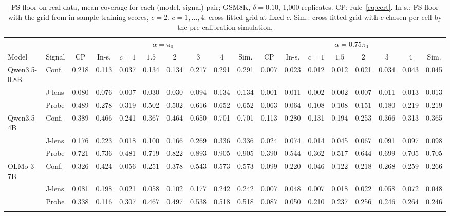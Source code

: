 \begin{table}[H]
\centering\scriptsize
\caption{FS-floor on real data, mean coverage for each (model, signal) pair; GSM8K, $\delta=0.10$, 1{,}000 replicates. CP: rule~\eqref{eq:cert}. In-s.: FS-floor with the grid from in-sample training scores, $c=2$. $c{=}1,\dots,4$: cross-fitted grid at fixed $c$. Sim.: cross-fitted grid with $c$ chosen per cell by the pre-calibration simulation.}
\label{tab:fsfull}
\setlength{\tabcolsep}{2.2pt}
\begin{tabular}{ll cccccccc cccccccc}
\toprule
 & & \multicolumn{8}{c}{$\alpha=\pi_0$} & \multicolumn{8}{c}{$\alpha=0.75\pi_0$} \\
\cmidrule(lr){3-10}\cmidrule(lr){11-18}
Model & Signal & CP & In-s. & $c{=}1$ & $1.5$ & $2$ & $3$ & $4$ & Sim. & CP & In-s. & $c{=}1$ & $1.5$ & $2$ & $3$ & $4$ & Sim. \\
\midrule
Qwen3.5-0.8B & Conf. & 0.218 & 0.113 & 0.037 & 0.134 & 0.134 & 0.217 & 0.291 & 0.291 & 0.007 & 0.023 & 0.012 & 0.012 & 0.021 & 0.034 & 0.043 & 0.045 \\
 & J-lens & 0.080 & 0.076 & 0.007 & 0.030 & 0.030 & 0.094 & 0.134 & 0.134 & 0.001 & 0.011 & 0.002 & 0.002 & 0.007 & 0.011 & 0.013 & 0.013 \\
 & Probe & 0.489 & 0.278 & 0.319 & 0.502 & 0.502 & 0.616 & 0.652 & 0.652 & 0.063 & 0.064 & 0.108 & 0.108 & 0.151 & 0.180 & 0.219 & 0.219 \\
\addlinespace
Qwen3.5-4B & Conf. & 0.389 & 0.466 & 0.241 & 0.367 & 0.464 & 0.650 & 0.701 & 0.701 & 0.113 & 0.280 & 0.131 & 0.194 & 0.253 & 0.366 & 0.313 & 0.365 \\
 & J-lens & 0.176 & 0.223 & 0.018 & 0.100 & 0.166 & 0.269 & 0.336 & 0.336 & 0.024 & 0.074 & 0.014 & 0.045 & 0.067 & 0.091 & 0.097 & 0.098 \\
 & Probe & 0.721 & 0.736 & 0.481 & 0.719 & 0.822 & 0.893 & 0.905 & 0.905 & 0.390 & 0.544 & 0.362 & 0.517 & 0.644 & 0.699 & 0.705 & 0.705 \\
\addlinespace
OLMo-3-7B & Conf. & 0.326 & 0.424 & 0.056 & 0.251 & 0.378 & 0.543 & 0.573 & 0.573 & 0.099 & 0.220 & 0.046 & 0.122 & 0.218 & 0.268 & 0.259 & 0.266 \\
 & J-lens & 0.081 & 0.198 & 0.021 & 0.058 & 0.102 & 0.177 & 0.242 & 0.242 & 0.007 & 0.048 & 0.007 & 0.018 & 0.022 & 0.058 & 0.072 & 0.048 \\
 & Probe & 0.338 & 0.116 & 0.307 & 0.467 & 0.497 & 0.538 & 0.518 & 0.518 & 0.087 & 0.050 & 0.210 & 0.237 & 0.256 & 0.246 & 0.264 & 0.246 \\
\addlinespace

\end{tabular}
\end{table}
